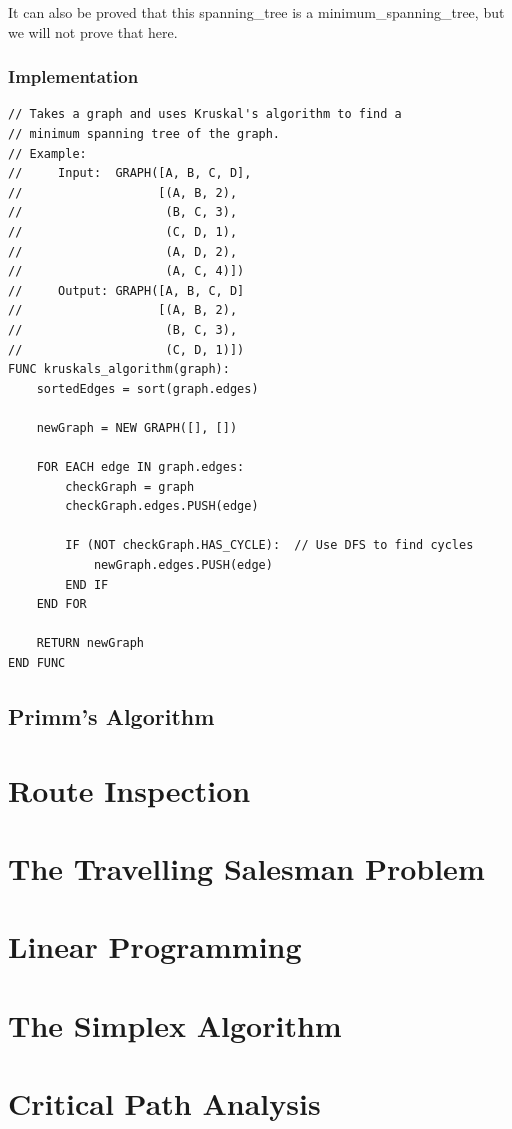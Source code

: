             It can also be proved that this \gls{spanning_tree} is a \gls{minimum_spanning_tree}, but we will not prove that here.

        \subsubsection{Implementation}
            \begin{verbatim}
// Takes a graph and uses Kruskal's algorithm to find a
// minimum spanning tree of the graph.
// Example:
//     Input:  GRAPH([A, B, C, D],
//                   [(A, B, 2),
//                    (B, C, 3),
//                    (C, D, 1),
//                    (A, D, 2),
//                    (A, C, 4)])
//     Output: GRAPH([A, B, C, D]
//                   [(A, B, 2),
//                    (B, C, 3),
//                    (C, D, 1)])
FUNC kruskals_algorithm(graph):
    sortedEdges = sort(graph.edges)

    newGraph = NEW GRAPH([], [])
    
    FOR EACH edge IN graph.edges:
        checkGraph = graph
        checkGraph.edges.PUSH(edge)

        IF (NOT checkGraph.HAS_CYCLE):  // Use DFS to find cycles
            newGraph.edges.PUSH(edge)
        END IF
    END FOR

    RETURN newGraph
END FUNC
            \end{verbatim}
            
    \subsection{Primm's Algorithm}
        

    \newpage

\section{Route Inspection} \label{route_inspection}

    \newpage

\section{The Travelling Salesman Problem} \label{the_travelling_salesman_problem}

    \newpage

\section{Linear Programming} \label{linear_programming}

    \newpage

\section{The Simplex Algorithm} \label{the_simplex_algorithm}

    \newpage

\section{Critical Path Analysis} \label{critical_path_analysis}

    \newpage
